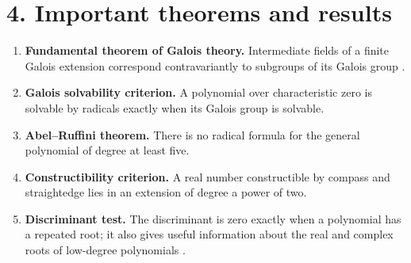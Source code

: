 \section*{4. Important theorems and results}
\begin{enumerate}[leftmargin=*,itemsep=0.35em]
\item \textbf{Fundamental theorem of Galois theory.} Intermediate fields of a finite Galois extension correspond contravariantly to subgroups of its Galois group \cite{galois_theory_ref1}.

\item \textbf{Galois solvability criterion.} A polynomial over characteristic zero is solvable by radicals exactly when its Galois group is solvable.

\item \textbf{Abel--Ruffini theorem.} There is no radical formula for the general polynomial of degree at least five.

\item \textbf{Constructibility criterion.} A real number constructible by compass and straightedge lies in an extension of degree a power of two.

\item \textbf{Discriminant test.} The discriminant is zero exactly when a polynomial has a repeated root; it also gives useful information about the real and complex roots of low-degree polynomials \cite{galois_theory_ref4}.
\end{enumerate}

\theoryapplications
{}
